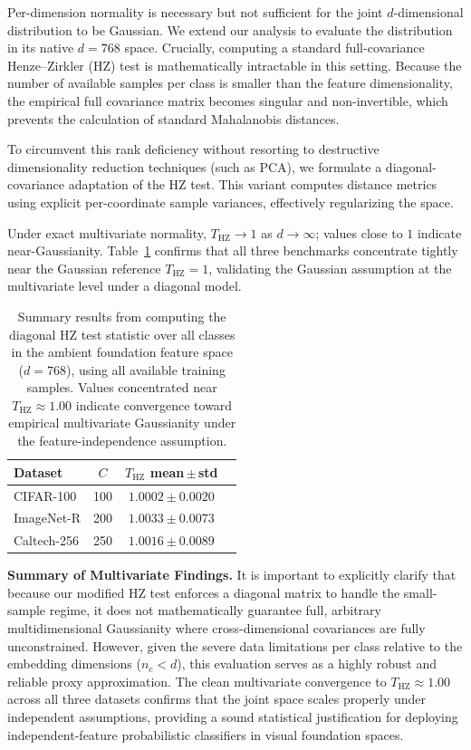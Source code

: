 Per-dimension normality is necessary but not sufficient for the joint $d$-dimensional distribution to be Gaussian. We extend our analysis to evaluate the distribution in its native $d=768$ space. Crucially, computing a standard full-covariance Henze--Zirkler (HZ) test is mathematically intractable in this setting. Because the number of available samples per class is smaller than the feature dimensionality, the empirical full covariance matrix becomes singular and non-invertible, which prevents the calculation of standard Mahalanobis distances.

To circumvent this rank deficiency without resorting to destructive dimensionality reduction techniques (such as PCA), we formulate a diagonal-covariance adaptation of the HZ test. This variant computes distance metrics using explicit per-coordinate sample variances, effectively regularizing the space.

Under exact multivariate normality, $T_{\mathrm{HZ}} \to 1$ as $d \to \infty$; values close to $1$ indicate near-Gaussianity. Table~\ref{tab:gaussianity_hz} confirms that all three benchmarks concentrate tightly near the Gaussian reference $T_{\mathrm{HZ}} = 1$, validating the Gaussian assumption at the multivariate level under a diagonal model.

\begin{table}[htb]
    \centering
    \caption{Summary results from computing the diagonal HZ test statistic over all classes in the ambient foundation feature space ($d=768$), using all available training samples. Values concentrated near $T_{\mathrm{HZ}} \approx 1.00$ indicate convergence toward empirical multivariate Gaussianity under the feature-independence assumption.}
    \label{tab:gaussianity_hz}
    \scriptsize
    \setlength{\tabcolsep}{4pt}
    \begin{tabular}{lcc c}
        \toprule
        \textbf{Dataset} & $C$ & $T_{\mathrm{HZ}}$ mean\,$\pm$\,std \\
        \midrule
        CIFAR-100   & 100 & $1.0002 \pm 0.0020$  \\
        ImageNet-R  & 200 & $1.0033 \pm 0.0073$ \\
        Caltech-256 & 250 & $1.0016 \pm 0.0089$ \\
        \bottomrule
    \end{tabular}
\end{table}

\textbf{Summary of Multivariate Findings.} It is important to explicitly clarify that because our modified HZ test enforces a diagonal matrix to handle the small-sample regime, it does not mathematically guarantee full, arbitrary multidimensional Gaussianity where cross-dimensional covariances are fully unconstrained. However, given the severe data limitations per class relative to the embedding dimensions ($n_c < d$), this evaluation serves as a highly robust and reliable proxy approximation. The clean multivariate convergence to $T_{\mathrm{HZ}} \approx 1.00$ across all three datasets confirms that the joint space scales properly under independent assumptions, providing a sound statistical justification for deploying independent-feature probabilistic classifiers in visual foundation spaces.

